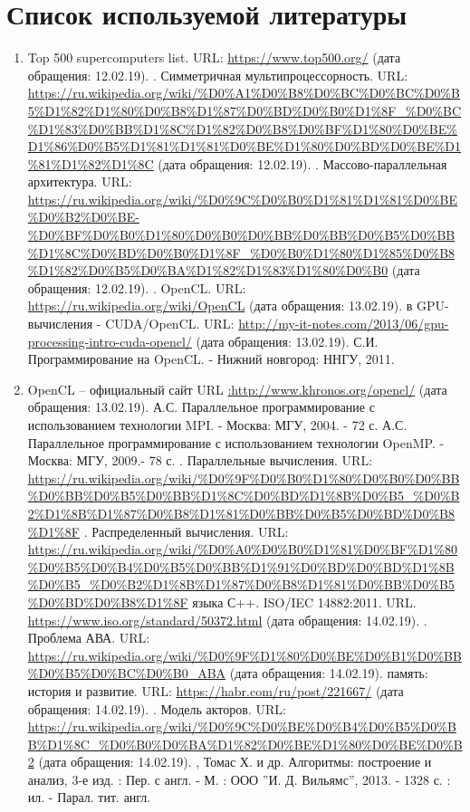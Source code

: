 { %
	\section*{Список используемой литературы}
	\begin{enumerate}
		\sloppy
		 В.В., Балакшин П.В. Введение в параллельные вычисления. – СПб: Университет ИТМО, 2016. – 51 с.
		\item Top 500 supercomputers list. URL: \url{https://www.top500.org/} (дата обращения: 12.02.19).
		. Симметричная мультипроцессорность. URL: \url{https://ru.wikipedia.org/wiki/%D0%A1%D0%B8%D0%BC%D0%BC%D0%B5%D1%82%D1%80%D0%B8%D1%87%D0%BD%D0%B0%D1%8F_%D0%BC%D1%83%D0%BB%D1%8C%D1%82%D0%B8%D0%BF%D1%80%D0%BE%D1%86%D0%B5%D1%81%D1%81%D0%BE%D1%80%D0%BD%D0%BE%D1%81%D1%82%D1%8C} (дата обращения: 12.02.19).
		. Массово-параллельная архитектура. URL: \url{https://ru.wikipedia.org/wiki/%D0%9C%D0%B0%D1%81%D1%81%D0%BE%D0%B2%D0%BE-%D0%BF%D0%B0%D1%80%D0%B0%D0%BB%D0%BB%D0%B5%D0%BB%D1%8C%D0%BD%D0%B0%D1%8F_%D0%B0%D1%80%D1%85%D0%B8%D1%82%D0%B5%D0%BA%D1%82%D1%83%D1%80%D0%B0} (дата обращения: 12.02.19).
		. OpenCL. URL: \url{https://ru.wikipedia.org/wiki/OpenCL} (дата обращения: 13.02.19).
		 в GPU-вычисления - CUDA/OpenCL. URL: \url{http://my-it-notes.com/2013/06/gpu-processing-intro-cuda-opencl/} (дата обращения: 13.02.19).
		 С.И. Программирование на OpenCL. - Нижний новгород: ННГУ, 2011.
		\item OpenCL – официальный сайт URL \url{:http://www.khronos.org/opencl/} (дата обращения: 13.02.19).
		 А.С. Параллельное программирование с использованием технологии MPI. - Москва: МГУ, 2004. - 72 с.
		 А.С. Параллельное программирование с использованием технологии OpenMP. - Москва: МГУ, 2009.- 78 с.
		. Параллельные вычисления. URL: \url{https://ru.wikipedia.org/wiki/%D0%9F%D0%B0%D1%80%D0%B0%D0%BB%D0%BB%D0%B5%D0%BB%D1%8C%D0%BD%D1%8B%D0%B5_%D0%B2%D1%8B%D1%87%D0%B8%D1%81%D0%BB%D0%B5%D0%BD%D0%B8%D1%8F}
		. Распределенный вычисления. URL: \url{https://ru.wikipedia.org/wiki/%D0%A0%D0%B0%D1%81%D0%BF%D1%80%D0%B5%D0%B4%D0%B5%D0%BB%D1%91%D0%BD%D0%BD%D1%8B%D0%B5_%D0%B2%D1%8B%D1%87%D0%B8%D1%81%D0%BB%D0%B5%D0%BD%D0%B8%D1%8F}
		 языка С++. ISO/IEC 14882:2011. URL. \url{https://www.iso.org/standard/50372.html} (дата обращения: 14.02.19).
		. Проблема АВА. URL: \url{https://ru.wikipedia.org/wiki/%D0%9F%D1%80%D0%BE%D0%B1%D0%BB%D0%B5%D0%BC%D0%B0_ABA} (дата обращения: 14.02.19).
		 память: история и развитие. URL: \url{https://habr.com/ru/post/221667/} (дата обращения: 14.02.19).
		. Модель акторов. URL: \url{https://ru.wikipedia.org/wiki/%D0%9C%D0%BE%D0%B4%D0%B5%D0%BB%D1%8C_%D0%B0%D0%BA%D1%82%D0%BE%D1%80%D0%BE%D0%B2} (дата обращения: 14.02.19).
		, Томас Х. и др. Алгоритмы: построение и анализ, 3-е изд. : Пер. с англ. - М. : ООО ''И. Д. Вильямс'', 2013. - 1328 с. : ил. - Парал. тит. англ.
	\end{enumerate}
}